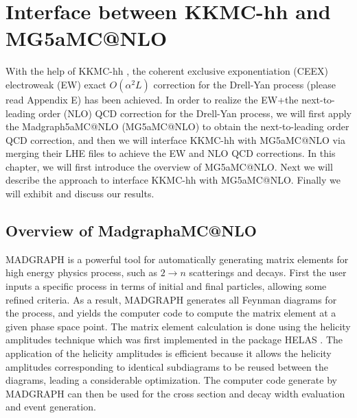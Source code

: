 \chapter{Interface between KKMC-hh and MG5\textunderscore aMC@NLO}
With the help of KKMC-hh \cite{KKMC-hh1,KKMC-hh2,KKMC0hh3}, the coherent exclusive exponentiation (CEEX) electroweak (EW) exact $O(\alpha^2L)$ correction for the Drell-Yan process (please read Appendix E) has been achieved. In order to realize the EW+the next-to-leading order (NLO) QCD correction for the Drell-Yan process, we will first apply the Madgraph5\textunderscore aMC@NLO (MG5\textunderscore aMC@NLO) \cite{MG5} to obtain the next-to-leading order QCD correction, and then we will interface KKMC-hh with MG5\textunderscore aMC@NLO via merging their LHE files to achieve the EW and NLO QCD corrections. In this chapter, we will first introduce the overview of MG5\textunderscore aMC@NLO. Next we will describe the approach to interface KKMC-hh with MG5\textunderscore aMC@NLO. Finally we will exhibit and discuss our results. 

\section{Overview of Madgraph\textunderscore aMC@NLO}

MADGRAPH \cite{madgraph} is a powerful tool for automatically generating matrix elements for high energy physics process, such as $2\to n$ scatterings and decays. First the user inputs a specific process in terms of initial and final particles, allowing some refined criteria. As a result, MADGRAPH generates all Feynman diagrams for the process, and yields the computer code to compute the matrix element at a given phase space point. The matrix element calculation is done using the helicity amplitudes technique which was first implemented in the package HELAS \cite{helas}. The application of the helicity amplitudes is efficient because it allows the helicity amplitudes corresponding to identical subdiagrams to be reused between the diagrams, leading a considerable optimization. The computer code generate by MADGRAPH can then be used for the cross section and decay width evaluation and event generation.

